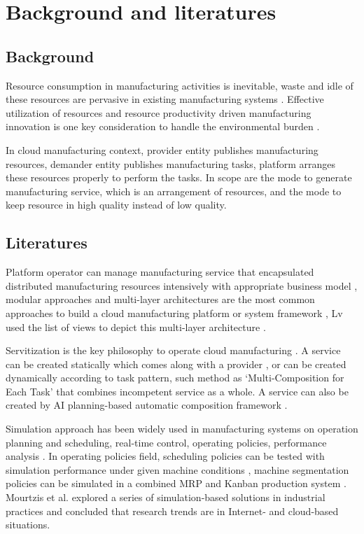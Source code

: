 \section{Background and literatures} %
\label{sec:literature_review}
\subsection{Background} %
\label{sub:background}
Resource consumption in manufacturing activities is inevitable, waste and idle of these resources  are pervasive in existing manufacturing systems \cite{Smith2012}. Effective utilization of resources and resource productivity driven manufacturing innovation is one key consideration to handle the environmental burden \cite{Dornfeld2014,Li2012}.


In cloud manufacturing context, provider entity publishes manufacturing resources, demander entity publishes manufacturing tasks, platform arranges these resources properly to perform the tasks.
In scope are the mode to generate manufacturing service, which is an arrangement of resources, and the mode to keep resource in high quality instead of low quality.   


\subsection{Literatures} %
\label{sub:literatures}

Platform operator can manage manufacturing service that encapsulated distributed manufacturing resources intensively with appropriate business model \cite{Xu2012}, modular approaches and multi-layer architectures are the most common approaches to build a cloud manufacturing platform or system framework \cite{Tao2012,Valilai2013}, Lv used the list of views to depict this multi-layer architecture \cite{LvJuly312012-Aug.22012}.

Servitization is the key philosophy to operate cloud manufacturing \cite{li2010cloud}. A  service can be created statically which comes along with a provider \cite{Tao2012}, or can be created dynamically according to task pattern, such method as `Multi-Composition for Each Task' \cite{Liu2013} that combines incompetent service as a whole. A service can also be created by AI planning-based automatic composition framework \cite{OhJan.-March2008}.

Simulation approach has been widely used in manufacturing systems on operation planning and scheduling, real-time control, operating policies, performance analysis \cite{Smith2003}. In operating policies field, scheduling policies can be tested with simulation performance under given machine conditions \cite{Sabuncuoglu2003}, machine
segmentation policies can be simulated in a combined MRP and Kanban production system \cite{Felberbauer9-12Dec.2012}. Mourtzis et al. \cite{Mourtzis2015} explored a series of simulation-based solutions in industrial practices and concluded that research trends are in  Internet- and cloud-based situations.

